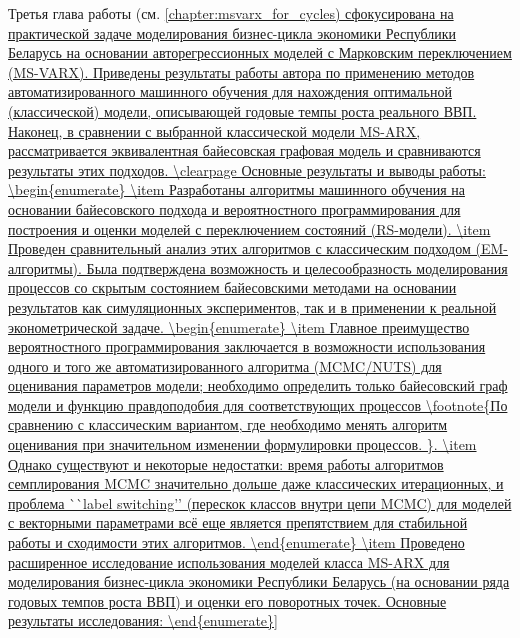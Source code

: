 \documentclass[a4paper,14pt]{extreport}
\begin{document}
Третья глава работы (см. \ref{chapter:msvarx_for_cycles) сфокусирована на практической задаче моделирования бизнес-цикла экономики Республики Беларусь на основании авторегрессионных моделей с Марковским переключением (MS-VARX). Приведены результаты работы автора по применению методов автоматизированного машинного обучения для нахождения оптимальной (классической) модели, описывающей годовые темпы роста реального ВВП. Наконец, в сравнении с выбранной классической модели MS-ARX, рассматривается эквивалентная байесовская графовая модель и сравниваются результаты этих подходов.

\clearpage

Основные результаты и выводы работы:

\begin{enumerate}
	\item Разработаны алгоритмы машинного обучения на основании байесовского подхода и вероятностного программирования для построения и оценки моделей с переключением состояний (RS-модели).
	\item Проведен сравнительный анализ этих алгоритмов с классическим подходом (EM-алгоритмы). Была подтверждена возможность и целесообразность моделирования процессов со скрытым состоянием байесовскими методами на основании результатов как симуляционных экспериментов, так и в применении к реальной эконометрической задаче.
	      \begin{enumerate}
		      \item Главное преимущество вероятностного программирования заключается в возможности использования одного и того же автоматизированного алгоритма (MCMC/NUTS) для оценивания параметров модели; необходимо определить только байесовский граф модели и функцию правдоподобия для соответствующих процессов \footnote{По сравнению с классическим вариантом, где необходимо менять алгоритм оценивания при значительном изменении формулировки процессов. }.
		      \item Однако существуют и некоторые недостатки: время работы алгоритмов семплирования MCMC значительно дольше даже классических итерационных, и проблема ``label switching’’ (перескок классов внутри цепи MCMC) для моделей с векторными параметрами всё еще является препятствием для стабильной работы и сходимости этих алгоритмов.
	      \end{enumerate}
	\item Проведено расширенное исследование использования моделей класса MS-ARX для моделирования бизнес-цикла экономики Республики Беларусь (на основании ряда годовых темпов роста ВВП) и оценки его поворотных точек. Основные результаты исследования:

\end{enumerate}}
\end{document}
